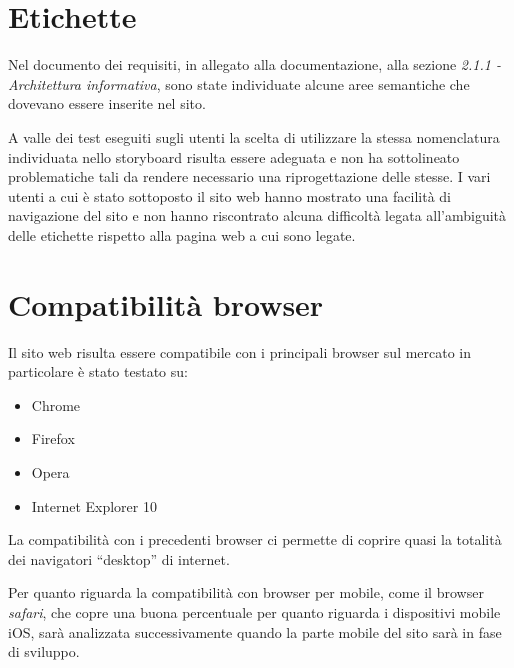 \documentclass[a4paper,12pt,hidelinks]{report}
\begin{document}
\section*{Etichette}
Nel documento dei requisiti, in allegato alla documentazione, alla sezione \textit{2.1.1 - Architettura informativa}, sono state individuate alcune aree semantiche 
che dovevano essere inserite nel sito. 
\par A valle dei test eseguiti sugli utenti la scelta di utilizzare la stessa nomenclatura individuata nello storyboard risulta essere adeguata e non ha sottolineato problematiche tali 
da rendere necessario una riprogettazione delle stesse. 
I vari utenti a cui è stato sottoposto il sito web hanno mostrato una facilità di navigazione del sito e non hanno riscontrato alcuna difficoltà legata all'ambiguità delle
etichette rispetto alla pagina web a cui sono legate.

\section*{Compatibilità browser}
Il sito web risulta essere compatibile con i principali browser sul mercato in particolare è stato testato su:
\begin{itemize}
 \item Chrome
 \item Firefox
 \item Opera
 \item Internet Explorer 10
\end{itemize}
La compatibilità con i precedenti browser ci permette di coprire quasi la totalità dei navigatori ``desktop'' di internet.
\par Per quanto riguarda la compatibilità con browser per mobile, come il browser \textit{safari}, che copre una buona percentuale per quanto riguarda i dispositivi mobile iOS, sarà analizzata successivamente
quando la parte mobile del sito sarà in fase di sviluppo.
\end{document}
